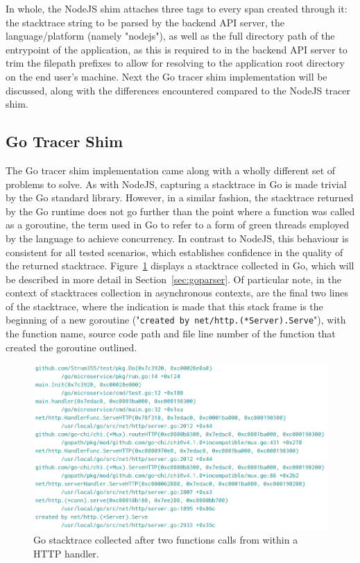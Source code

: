 \documentclass[12pt,pdftex,titlepage]{report}
\begin{document}
                In whole, the NodeJS shim attaches three tags to every span created through it: the stacktrace string to be parsed by the backend API server, the language/platform (namely "nodejs"), as well
                as the full directory path of the entrypoint of the application, as this is required to in the backend API server to trim the filepath prefixes to allow for resolving to the application
                root directory on the end user's machine. Next the Go tracer shim implementation will be discussed, along with the differences encountered compared to the NodeJS tracer shim.

            \subsection{Go Tracer Shim}
                The Go tracer shim implementation came along with a wholly different set of problems to solve. As with NodeJS, capturing a stacktrace in Go is made trivial by the Go standard library. However,
                in a similar fashion, the stacktrace returned by the Go runtime does not go further than the point where a function was called as a goroutine\cite{goroutine}, the term used in Go to refer to a 
                form of green threads employed by the language to achieve concurrency. In contrast to NodeJS, this behaviour is consistent for all tested scenarios, which establishes confidence in the quality 
                of the returned stacktrace. Figure~\ref{fig:gostack} displays a stacktrace collected in Go, which will be described in more detail in Section~\ref{sec:goparser}. Of particular note, in the context
                of stacktraces collection in asynchronous contexts, are the final two lines of the stacktrace, where the indication is made that this stack frame is the beginning of a new goroutine ("\texttt{created
                by net/http.(*Server).Serve}"), with the function name, source code path and file line number of the function that created the goroutine outlined.

                \begin{figure}[hbt!]
                    \centering
                    \includegraphics[scale=0.4]{gostack.png}
                    \caption{Go stacktrace collected after two functions calls from within a HTTP handler.}
                    \label{fig:gostack}
                \end{figure}
\end{document}
